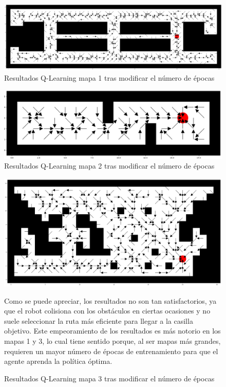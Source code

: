 \documentclass[conference,a4paper]{IEEEtran}
\begin{document}
\begin{figure}[h]
  \centering
  \includegraphics[scale=0.33]{resultado_2_qlearning_mapa_1}
  \caption{Resultados Q-Learning mapa 1 tras modificar el número de épocas}
  \label{fig:resultado_2_qlearning_mapa_1}
\end{figure}

\begin{figure}[h]
  \centering
  \includegraphics[scale=0.33]{resultado_2_qlearning_mapa_2}
  \caption{Resultados Q-Learning mapa 2 tras modificar el número de épocas}
  \label{fig:resultado_2_qlearning_mapa_2}
\end{figure}

\begin{figure}[h]
  \includegraphics[scale=0.33]{resultado_2_qlearning_mapa_3}
  \caption{Resultados Q-Learning mapa 3 tras modificar el número de épocas}
  \label{fig:resultado_2_qlearning_mapa_3}
  \vspace{0.5cm}
  Como se puede apreciar, los resultados no son tan satisfactorios, ya que el robot colisiona con los obstáculos en ciertas ocasiones y no suele seleccionar la ruta más eficiente para llegar a la casilla objetivo. 
  Este empeoramiento de los resultados es más notorio en los mapas 1 y 3, lo cual tiene sentido porque, al ser mapas más grandes, requieren un mayor número de épocas de entrenamiento para que el agente aprenda la política óptima.\newline
\end{figure}
\end{document}
